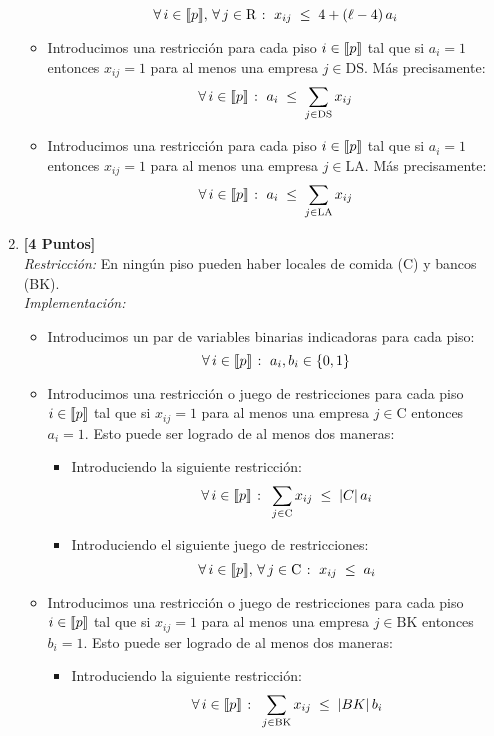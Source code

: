 \documentclass[ a4paper, twoside, 11pt]{article}
\begin{document}
\begin{problem}
\begin{enumerate}[label=\textbf{\alph*)}]
\begin{itemize}
\[
\forall \, i \in \llbracket p \rrbracket, \, \forall \, j \in \text{R} \; \colon \;
x_{ij} \; \leq \; 4 + (\ell - 4) \, a_i
\]
\item Introducimos una restricci\'on para cada piso $i \in \llbracket p \rrbracket$ tal que si $a_i = 1$ entonces $x_{ij} = 1$ para al menos una empresa $j \in \text{DS}$. M\'as precisamente: 
\[
\forall \, i \in \llbracket p \rrbracket \; \colon \;
a_i \; \leq \; \sum_{j \in \text{DS}} x_{ij}
\]
\item Introducimos una restricci\'on para cada piso $i \in \llbracket p \rrbracket$ tal que si $a_i = 1$ entonces $x_{ij} = 1$ para al menos una empresa $j \in \text{LA}$. M\'as precisamente: 
\[
\forall \, i \in \llbracket p \rrbracket \; \colon \;
a_i \; \leq \; \sum_{j \in \text{LA}} x_{ij}
\]
\end{itemize}
\item \textbf{[4 Puntos]} \\[1ex]
\emph{Restricci\'on:} En ning\'un piso pueden haber locales de comida (C) y bancos (BK). \\[1ex]
\emph{Implementaci\'on:}
\begin{itemize}
\item Introducimos un par de variables binarias indicadoras para cada piso: 
\[
\forall \, i \in \llbracket p \rrbracket \; \colon \; a_i, b_i \in \{ 0, 1 \}
\]
\item Introducimos una restricci\'on o juego de restricciones para cada piso $i \in \llbracket p \rrbracket$ tal que si $x_{ij} = 1$ para al menos una empresa $j \in \text{C}$ entonces $a_i = 1$. Esto puede ser logrado de al menos dos maneras: 
\begin{itemize}
\item Introduciendo la siguiente restricci\'on: 
\[
\forall \, i \in \llbracket p \rrbracket \; \colon \;
\sum_{j \in \text{C}} x_{ij} \; \leq \; |C| \, a_i
\]
\item Introduciendo el siguiente juego de restricciones: 
\[
\forall \, i \in \llbracket p \rrbracket, \, \forall \, j \in \text{C} \; \colon \;
x_{ij} \; \leq \; a_i
\]
\end{itemize}
\item Introducimos una restricci\'on o juego de restricciones para cada piso $i \in \llbracket p \rrbracket$ tal que si $x_{ij} = 1$ para al menos una empresa $j \in \text{BK}$ entonces $b_i = 1$. Esto puede ser logrado de al menos dos maneras: 
\begin{itemize}
\item Introduciendo la siguiente restricci\'on: 
\[
\forall \, i \in \llbracket p \rrbracket \; \colon \;
\sum_{j \in \text{BK}} x_{ij} \; \leq \; |BK| \, b_i
\]
\end{itemize}
\end{itemize}
\end{enumerate}
\end{problem}
\end{document}
